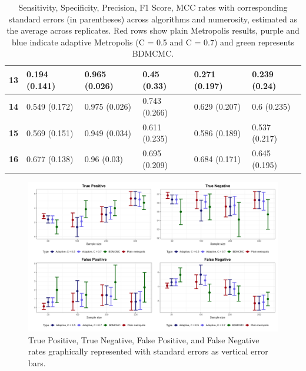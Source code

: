 \documentclass{report}
\begin{document}
\begin{table}[!h]
\begin{tabular}{|l|l|l|l|l|l|}
		\rowcolor{green!8} \textbf{13} & 0.194 (0.141) & 0.965 (0.026) & 0.45 (0.33) & 0.271 (0.197) & 0.239 (0.24) \\ \hline
		\rowcolor{green!8} \textbf{14} & 0.549 (0.172) & 0.975 (0.026) & 0.743 (0.266) & 0.629 (0.207) & 0.6 (0.235) \\ \hline
		\rowcolor{green!8} \textbf{15} & 0.569 (0.151) & 0.949 (0.034) & 0.611 (0.235) & 0.586 (0.189) & 0.537 (0.217) \\ \hline
		\rowcolor{green!8} \textbf{16} & 0.677 (0.138) & 0.96 (0.03) & 0.695 (0.209) & 0.684 (0.171) & 0.645 (0.195) \\ \hline
	\end{tabular}
	\caption{Sensitivity, Specificity, Precision, F1 Score, MCC rates with corresponding standard errors (in parentheses) across algorithms and numerosity, estimated as the average across replicates. Red rows show plain Metropolis results, purple and blue indicate adaptive Metropolis (C = 0.5 and C = 0.7) and green represents BDMCMC.}
	\label{table:metrics-second}
\end{table}

\begin{figure}[h] 
	\centering
	\includegraphics[width=1.0\textwidth]{Figures/Overall_comparison/metric_plots1.png}
	\caption{True Positive, True Negative, False Positive, and False Negative rates graphically represented with standard errors as vertical error bars. }
	\label{fig:metric-plots1}
\end{figure}
\end{document}
